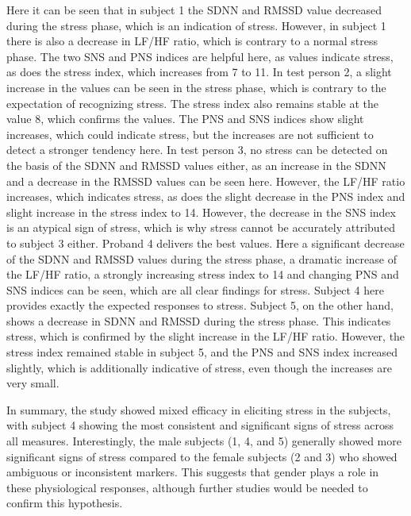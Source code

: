 Here it can be seen that in subject 1 the SDNN and RMSSD value decreased during the stress phase, which is an indication of stress.
However, in subject 1 there is also a decrease in LF/HF ratio, which is contrary to a normal stress phase.
The two SNS and PNS indices are helpful here, as values indicate stress, as does the stress index, which increases from 7 to 11.
In test person 2, a slight increase in the values can be seen in the stress phase, which is contrary to the expectation of recognizing stress.
The stress index also remains stable at the value 8, which confirms the values. 
The PNS and SNS indices show slight increases, which could indicate stress, but the increases are not sufficient to detect a stronger tendency here. 
In test person 3, no stress can be detected on the basis of the SDNN and RMSSD values either, as an increase in the SDNN and a decrease in the RMSSD values can be seen here. 
However, the LF/HF ratio increases, which indicates stress, as does the slight decrease in the PNS index and slight increase in the stress index to 14. 
However, the decrease in the SNS index is an atypical sign of stress, which is why stress cannot be accurately attributed to subject 3 either.
Proband 4 delivers the best values.
Here a significant decrease of the SDNN and RMSSD values during the stress phase, a dramatic increase of the LF/HF ratio, a strongly increasing stress index to 14 and changing PNS and SNS indices can be seen, which are all clear findings for stress.
Subject 4 here provides exactly the expected responses to stress.
Subject 5, on the other hand, shows a decrease in SDNN and RMSSD during the stress phase. 
This indicates stress, which is confirmed by the slight increase in the LF/HF ratio.
However, the stress index remained stable in subject 5, and the PNS and SNS index increased slightly, which is additionally indicative of stress, even though the increases are very small.

In summary, the study showed mixed efficacy in eliciting stress in the subjects, with subject 4 showing the most consistent and significant signs of stress across all measures. Interestingly, the male subjects (1, 4, and 5) generally showed more significant signs of stress compared to the female subjects (2 and 3) who showed ambiguous or inconsistent markers. This suggests that gender plays a role in these physiological responses, although further studies would be needed to confirm this hypothesis.

